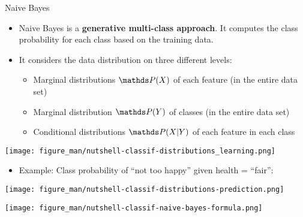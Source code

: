 \documentclass[11pt,compress,t,notes=noshow, xcolor=table]{beamer}
\begin{document}
\begin{vbframe}{Naive Bayes}
\begin{itemize}
\item \small Naive Bayes is a \textbf{generative multi-class approach}. It computes the class probability for each class based on the training data.
\item \small It considers the data distribution on three different levels:
    \begin{itemize}
    \item \small Marginal distributions $\P(X)$ of each feature (in the entire data set)
    \item \small Marginal distribution $\P(Y)$ of classes (in the entire data set)
    \item \small Conditional distributions $\P(X|Y)$ of each feature in each class
    \end{itemize}
\vspace*{1cm}
\end{itemize}
\begin{center}
  \texttt{[image: figure\_man/nutshell-classif-distributions\_learning.png]}
\end{center}

\newpage
\begin{itemize}
\item \small Example: Class probability of ``not too happy'' given health = ``fair'':
\end{itemize}
\begin{center}
  \texttt{[image: figure\_man/nutshell-classif-distributions-prediction.png]}
\end{center}
\begin{center}
  \texttt{[image: figure\_man/nutshell-classif-naive-bayes-formula.png]}
\end{center}

\end{vbframe}

\endlecture
\end{document}
